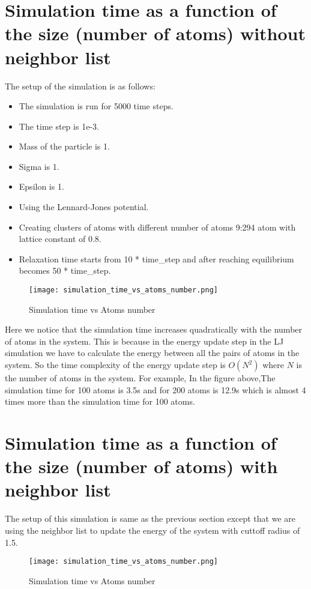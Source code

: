 \section{Simulation time as a function of the size (number of atoms) without neighbor list}
    The setup of the simulation is as follows:
    \begin{itemize}
        \item The simulation is run for 5000 time steps.
        \item The time step is 1e-3.
        \item Mass of the particle is 1.
        \item Sigma is 1.
        \item Epsilon is 1.
        \item Using the Lennard-Jones potential.
        \item Creating clusters of atoms with different number of atoms 9:294 atom with lattice constant of 0.8.
        \item Relaxation time starts from 10 * time\_step and after reaching equilibrium  becomes 50 * time\_step.
    \end{itemize}
    \graphicspath{ {./figures/milestone05/} }
    \begin{figure}[!htb]
    \centering
        \texttt{[image: simulation\_time\_vs\_atoms\_number.png]}
        \caption{Simulation time vs Atoms number}
    \label{fig:simulation_time_vs_atoms_number}
    \end{figure}
    Here we notice that the simulation time increases quadratically with the number of atoms in the system. This is because in the energy update step in the LJ simulation we have to calculate the energy between all the pairs of atoms in the system. So the time complexity of the energy update step is $O(N^2)$ where $N$ is the number of atoms in the system. For example, In the figure above,The  simulation time for 100 atoms is 3.5s and for 200 atoms is 12.9s which is almost 4 times more than the simulation time for 100 atoms.

\section{Simulation time as a function of the size (number of atoms) with neighbor list}
    The setup of this simulation is same as the previous section except that we are using the neighbor list to update the energy of the system with cuttoff radius of 1.5.
    \graphicspath{ {./figures/milestone06/} }
    \begin{figure}[!htb]
    \centering
        \texttt{[image: simulation\_time\_vs\_atoms\_number.png]}
        \caption{Simulation time vs Atoms number}
    \label{fig:simulation_time_vs_atoms_number}
    \end{figure}  

